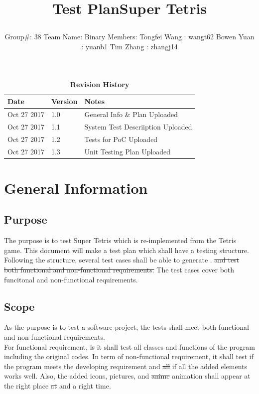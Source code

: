 \documentclass[12pt, titlepage]{article}
\title{\parbox{\linewidth}{\centering Test Plan\endgraf\bigskip Super Tetris}}
\author{\parbox{\linewidth}{\bigskip \centering Group\#: 38 \endgraf\bigskip Team Name: Binary \endgraf\bigskip Members: \endgraf\bigskip Tongfei Wang : wangt62 \endgraf\bigskip Bowen Yuan : yuanb1 \endgraf\bigskip Tim Zhang : zhangj14}}
\date{\parbox{\linewidth}{\bigskip\bigskip \centering \today\endgraf\bigskip SFWR ENG 3XA3 \endgraf\bigskip McMaster University}}
\begin{document}
\maketitle

\tableofcontents
\listoftables
\listoffigures

\begin{table}[bp]
\caption{\bf Revision History}
\begin{tabularx}{\textwidth}{p{3cm}p{2cm}X}
\toprule {\bf Date} & {\bf Version} & {\bf Notes}\\
\midrule
Oct 27 2017 & 1.0 & General Info \& Plan Uploaded\\
Oct 27 2017 & 1.1 &  System Test Descriiption Uploaded\\
Oct 27 2017 & 1.2 & Tests for PoC Uploaded\\
Oct 27 2017 & 1.3 & Unit Testing Plan Uploaded\\
\bottomrule
\end{tabularx}
\end{table}

\newpage


\section{General Information}

\subsection{Purpose}
\tab The purpose is to test Super Tetris which is re-implemented from the Tetris game. This document will make a test plan which shall have a testing structure. Following the structure, several test cases shall be able to generate . \st{and test both functional and non-functional requirements.} {\color{red} The test cases cover both funcitonal and non-functional requirements.}

\subsection{Scope}
 \tab As the purpose is to test a software project, the tests shall meet both functional and non-functional requirements.\\
 For functional requirement, \st{is} {\color{red} it} shall test all classes and functions of the program including the original codes. In term of non-functional requirement, it shall test if the program meets the developing requirement and \st{all} if all the added elements works well. Also, the added icons, pictures, and \st{anime} {\color{red} animation} shall appear at the right place \st{at} {\color{red} and} a right time.
\end{document}
